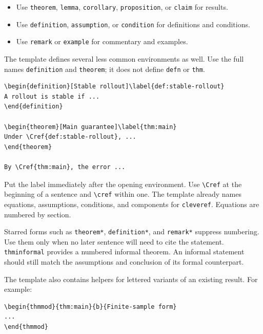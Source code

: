 \begin{itemize}[leftmargin=*]
    \item Use \texttt{theorem}, \texttt{lemma}, \texttt{corollary},
    \texttt{proposition}, or \texttt{claim} for results.
    \item Use \texttt{definition}, \texttt{assumption}, or
    \texttt{condition} for definitions and conditions.
    \item Use \texttt{remark} or \texttt{example} for commentary and
    examples.
\end{itemize}

The template defines several less common environments as well. Use the full
names \texttt{definition} and \texttt{theorem}; it does not define
\texttt{defn} or \texttt{thm}.

\begin{verbatim}
\begin{definition}[Stable rollout]\label{def:stable-rollout}
A rollout is stable if ...
\end{definition}

\begin{theorem}[Main guarantee]\label{thm:main}
Under \Cref{def:stable-rollout}, ...
\end{theorem}

By \Cref{thm:main}, the error ...
\end{verbatim}

Put the label immediately after the opening environment. Use
\texttt{\textbackslash Cref} at the beginning of a sentence and
\texttt{\textbackslash cref} within one. The template already names equations,
assumptions, conditions, and components for \texttt{cleveref}. Equations are
numbered by section.

Starred forms such as \texttt{theorem*}, \texttt{definition*}, and
\texttt{remark*} suppress numbering. Use them only when no later sentence
will need to cite the statement. \texttt{thminformal} provides a numbered
informal theorem. An informal statement should still match the assumptions
and conclusion of its formal counterpart.

The template also contains helpers for lettered variants of an existing
result. For example:

\begin{verbatim}
\begin{thmmod}{thm:main}{b}{Finite-sample form}
...
\end{thmmod}
\end{verbatim}

